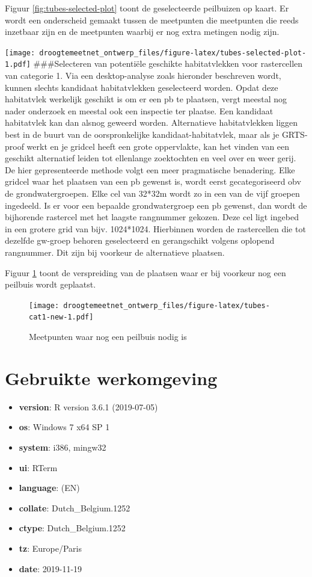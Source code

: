 \documentclass[11pt,]{book}
\providecommand{\tightlist}{%
  \setlength{\itemsep}{0pt}\setlength{\parskip}{0pt}}
\begin{document}
Figuur \ref{fig:tubes-selected-plot} toont de geselecteerde peilbuizen
op kaart. Er wordt een onderscheid gemaakt tussen de meetpunten die
meetpunten die reeds inzetbaar zijn en de meetpunten waarbij er nog
extra metingen nodig zijn.

\texttt{[image: droogtemeetnet\_ontwerp\_files/figure-latex/tubes-selected-plot-1.pdf]}
\#\#\#Selecteren van potentiële geschikte habitatvlekken voor
rastercellen van categorie 1. Via een desktop-analyse zoals hieronder
beschreven wordt, kunnen slechts kandidaat habitatvlekken geselecteerd
worden. Opdat deze habitatvlek werkelijk geschikt is om er een pb te
plaatsen, vergt meestal nog nader onderzoek en meestal ook een inspectie
ter plaatse. Een kandidaat habitatvlek kan dan alsnog geweerd worden.
Alternatieve habitatvlekken liggen best in de buurt van de
oorspronkelijke kandidaat-habitatvlek, maar als je GRTS-proof werkt en
je gridcel heeft een grote oppervlakte, kan het vinden van een geschikt
alternatief leiden tot ellenlange zoektochten en veel over en weer
gerij. De hier gepresenteerde methode volgt een meer pragmatische
benadering. Elke gridcel waar het plaatsen van een pb gewenst is, wordt
eerst gecategoriseerd obv de grondwatergroepen. Elke cel van 32*32m
wordt zo in een van de vijf groepen ingedeeld. Is er voor een bepaalde
grondwatergroep een pb gewenst, dan wordt de bijhorende rastercel met
het laagste rangnummer gekozen. Deze cel ligt ingebed in een grotere
grid van bijv. 1024*1024. Hierbinnen worden de rastercellen die tot
dezelfde gw-groep behoren geselecteerd en gerangschikt volgens oplopend
rangnummer. Dit zijn bij voorkeur de alternatieve plaatsen.

Figuur \ref{fig:tubes-cat1-new} toont de verspreiding van de plaatsen
waar er bij voorkeur nog een peilbuis wordt geplaatst.

\begin{figure}
\centering
\texttt{[image: droogtemeetnet\_ontwerp\_files/figure-latex/tubes-cat1-new-1.pdf]}
\caption{\label{fig:tubes-cat1-new}Meetpunten waar nog een peilbuis nodig
is}
\end{figure}

\appendix


\chapter{Gebruikte werkomgeving}\label{gebruikte-werkomgeving}

\begin{itemize}
\tightlist
\item
  \textbf{version}: R version 3.6.1 (2019-07-05)
\item
  \textbf{os}: Windows 7 x64 SP 1
\item
  \textbf{system}: i386, mingw32
\item
  \textbf{ui}: RTerm
\item
  \textbf{language}: (EN)
\item
  \textbf{collate}: Dutch\_Belgium.1252
\item
  \textbf{ctype}: Dutch\_Belgium.1252
\item
  \textbf{tz}: Europe/Paris
\item
  \textbf{date}: 2019-11-19
\end{itemize}
\end{document}
